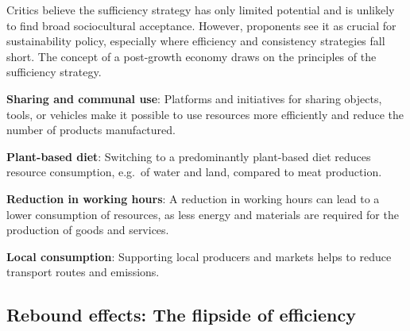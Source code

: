 \documentclass[
  a4paper,
  openany]{book}
\begin{document}
Critics believe the sufficiency strategy has only limited potential and
is unlikely to find broad sociocultural acceptance. However, proponents
see it as crucial for sustainability policy, especially where efficiency
and consistency strategies fall short. The concept of a post-growth
economy draws on the principles of the sufficiency strategy.

\begin{tcolorbox}[enhanced jigsaw, left=2mm, arc=.35mm, titlerule=0mm, opacityback=0, leftrule=.75mm, title={Putting Sufficiency Strategies into Action: Examples}, breakable, bottomtitle=1mm, rightrule=.15mm, coltitle=black, toptitle=1mm, bottomrule=.15mm, colback=white, opacitybacktitle=0.6, colbacktitle=quarto-callout-tip-color!10!white, toprule=.15mm, colframe=quarto-callout-tip-color-frame]

\textbf{Sharing and communal use}: Platforms and initiatives for sharing
objects, tools, or vehicles make it possible to use resources more
efficiently and reduce the number of products manufactured.

\textbf{Plant-based diet}: Switching to a predominantly plant-based diet
reduces resource consumption, e.g.~of water and land, compared to meat
production.

\textbf{Reduction in working hours}: A reduction in working hours can
lead to a lower consumption of resources, as less energy and materials
are required for the production of goods and services.

\textbf{Local consumption}: Supporting local producers and markets helps
to reduce transport routes and emissions.

\end{tcolorbox}

\subsection{Rebound effects: The flipside of
efficiency}\label{rebound-effects-the-flipside-of-efficiency}
\end{document}
